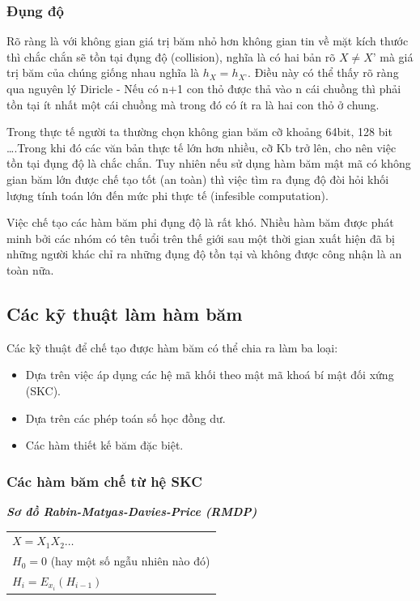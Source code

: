 \documentclass[a4paper,12pt]{report}
\begin{document}
\subsubsection{Đụng độ}
Rõ ràng là với không gian giá trị băm nhỏ hơn không gian tin về mặt kích thước thì chắc chắn sẽ tồn tại đụng độ (collision), nghĩa là có hai bản rõ $X \neq X’$ mà giá trị băm của chúng giống nhau nghĩa là $h_X=h_{X’}$. Điều này có thể thấy rõ ràng qua nguyên lý Diricle - Nếu có n+1 con thỏ được thả vào n cái chuồng thì phải tồn tại ít nhất một cái chuồng mà trong đó có ít ra là hai con thỏ ở chung.

Trong thực tế người ta thường chọn không gian băm cỡ khoảng 64bit, 128 bit \ldots .Trong khi đó các văn bản thực tế lớn hơn nhiều, cỡ Kb trở lên, cho nên việc tồn tại đụng độ là chắc chắn. Tuy nhiên nếu sử dụng hàm băm mật mã có không gian băm lớn được chế tạo tốt (an toàn) thì việc tìm ra đụng độ đòi hỏi khối lượng tính toán lớn đến mức phi thực tế (infesible computation).

Việc chế tạo các hàm băm phi đụng độ là rất khó. Nhiều hàm băm được phát minh bởi các nhóm có tên tuổi trên thế giới sau một thời gian xuất hiện đã bị những người khác chỉ ra những đụng độ tồn tại và không được công nhận là an toàn nữa.
\subsection*{Các kỹ thuật làm hàm băm}
Các kỹ thuật để chế tạo được hàm băm có thể chia ra làm ba loại:
\begin{itemize}
\item Dựa trên việc áp dụng các hệ mã khối theo mật mã khoá bí mật đối xứng (SKC).
\item Dựa trên các phép toán số học đồng dư.
\item Các hàm thiết kế băm đặc biệt.
\end{itemize}
\subsubsection{Các hàm băm chế từ hệ SKC}
\textbf{\textit{Sơ đồ Rabin-Matyas-Davies-Price (RMDP)}}
\begin{center}
\begin{tabular}{l}
$X = X_1 X_2 \ldots$ \\
$H_0 = 0$ (hay một số ngẫu nhiên nào đó) \\
$H_i = E_{x_i}(H_{i - 1})$ \\
\end{tabular}
\end{center}
\end{document}
